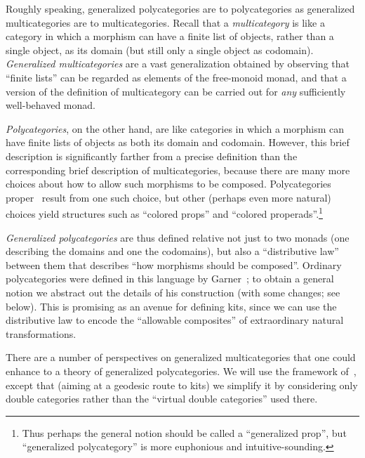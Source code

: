\documentclass{amsart}
\begin{document}
Roughly speaking, generalized polycategories are to polycategories as generalized multicategories are to multicategories.
Recall that a \emph{multicategory} is like a category in which a morphism can have a finite list of objects, rather than a single object, as its domain (but still only a single object as codomain).
\emph{Generalized multicategories} are a vast generalization obtained by observing that ``finite lists'' can be regarded as elements of the free-monoid monad, and that a version of the definition of multicategory can be carried out for \emph{any} sufficiently well-behaved monad.

\emph{Polycategories}, on the other hand, are like categories in which a morphism can have finite lists of objects as both its domain and codomain.
However, this brief description is significantly farther from a precise definition than the corresponding brief description of multicategories, because there are many more choices about how to allow such morphisms to be composed.
Polycategories proper~\cite{szabo:polycats,cs:wk-distrib} result from one such choice, but other (perhaps even more natural) choices yield structures such as ``colored props'' and ``colored properads''.\footnote{Thus perhaps the general notion should be called a ``generalized prop'', but ``generalized polycategory'' is more euphonious and intuitive-sounding.}

\emph{Generalized polycategories} are thus defined relative not just to two monads (one describing the domains and one the codomains), but also a ``distributive law'' between them that describes ``how morphisms should be composed''.
Ordinary polycategories were defined in this language by Garner~\cite{garner:polycats}; to obtain a general notion we abstract out the details of his construction (with some changes; see below).
This is promising as an avenue for defining kits, since we can use the distributive law to encode the ``allowable composites'' of extraordinary natural transformations.

There are a number of perspectives on generalized multicategories that one could enhance to a theory of generalized polycategories.
We will use the framework of~\cite{cs:multicats}, except that (aiming at a geodesic route to kits) we simplify it by considering only double categories rather than the ``virtual double categories'' used there.
\end{document}
